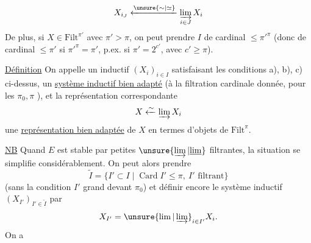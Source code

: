 \[
X_{i_J}\xleftarrow{\unsure{\sim|\simeq}}\varinjlim_{i\in J}X_i
\]
De plus, si $X\in\mathrm{Filt}^{\pi'}$ avec $\pi'>\pi$, on peut prendre $I$ de cardinal $\leq\pi'^\pi$ (donc de cardinal $\leq\pi'$ si $\pi'^\pi=\pi'$, p.ex. si $\pi'=2^{c'}$, avec $c'\geq\pi$).

\uline{Définition} On appelle un   inductif $(X_i)_{i\in I}$ satisfaisant les conditions a), b), c) ci-dessus, un \uline{système inductif bien adapté} (à la filtration cardinale donnée, pour les   $\pi_0,\pi$  ), et la représentation correspondante
\[
X\xleftarrow{\sim}\varinjlim X_i
\]
une \uline{représentation bien adaptée} de $X$ en termes d'objets de $\mathrm{Filt}^{\pi}$.

\uline{NB} Quand $E$ est stable par petites $\unsure{\varinjlim|\underline{\lim}}$ filtrantes, la situation se simplifie considérablement. On peut alors prendre
\[
\widetilde I=\{I'\subset I\mid\operatorname{Card}I'\leq\pi,\ I'\text{ filtrant}\}
\]
(sans  la condition $I'$ grand devant $\pi_0$) et définir encore le système inductif $(X_{I'})_{I'\in\widetilde I}$ par
\[
X_{I'}=\unsure{\lim|\varinjlim}_{i\in I'}X_i.
\]
On a 
